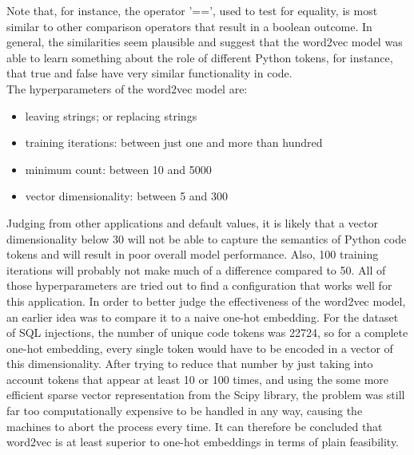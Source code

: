 \documentclass[
a4paper,
pagesize,
pdftex,
12pt,
twoside, %
BCOR=5mm, %
ngerman,
fleqn,
final,
]{scrartcl}
\begin{document}
	Note that, for instance, the operator '==', used to test for equality, is most similar to other comparison operators that result in a boolean outcome. In general, the similarities seem plausible and suggest that the word2vec model was able to learn something about the role of different Python tokens, for instance, that true and false have very similar functionality in code.\\ 
	The hyperparameters of the word2vec model are:
	\begin{itemize}[noitemsep]
		\item leaving strings; or replacing strings
		\item training iterations: between just one and more than hundred
		\item minimum count: between 10 and 5000
		\item vector dimensionality: between 5 and 300
	\end{itemize}
	
	Judging from other applications and default values, it is likely that a vector dimensionality below 30 will not be able to capture the semantics of Python code tokens and will result in poor overall model performance. Also, 100 training iterations will probably not make much of a difference compared to 50. All of those hyperparameters are tried out to find a configuration that works well for this application.
	In order to better judge the effectiveness of the word2vec model, an earlier idea was to compare it to a naive one-hot embedding. For the dataset of SQL injections, the number of unique code tokens was 22724, so for a complete one-hot embedding, every single token would have to be encoded in a vector of this dimensionality. After trying to reduce that number by just taking into account tokens that appear at least 10 or 100 times, and using the some more efficient sparse vector representation from the Scipy library, the problem was still far too computationally expensive to be handled in any way, causing the machines to abort the process every time. It can therefore be concluded that word2vec is at least superior to one-hot embeddings in terms of plain feasibility.
	
	
	
\end{document}
